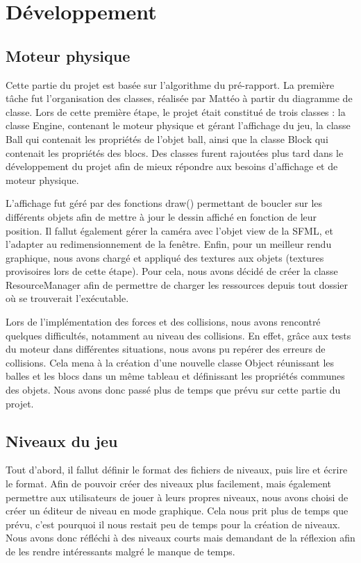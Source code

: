 \chapter{Développement}

\section{Moteur physique}

Cette partie du projet est basée sur l'algorithme du pré-rapport.
La première tâche fut l'organisation des classes, réalisée par Mattéo
à partir du diagramme de classe. Lors de cette première étape, le projet
était constitué de trois classes : la classe Engine, contenant le moteur
physique et gérant l'affichage du jeu, la classe Ball qui contenait les
propriétés de l'objet ball, ainsi que la classe Block qui contenait les
propriétés des blocs. Des classes furent rajoutées plus tard dans le
développement du projet afin de mieux répondre aux besoins d'affichage
et de moteur physique.

L'affichage fut géré par des fonctions draw() permettant de boucler
sur les différents objets afin de mettre à jour le dessin affiché en
fonction de leur position. Il fallut également gérer la caméra avec
l'objet view de la SFML, et l'adapter au redimensionnement de la
fenêtre. Enfin, pour un meilleur rendu graphique, nous avons chargé
et appliqué des textures aux objets (textures provisoires lors de
cette étape). Pour cela, nous avons décidé de créer la classe
ResourceManager afin de permettre de charger les ressources depuis
tout dossier où se trouverait l'exécutable.

Lors de l'implémentation des forces et des collisions, nous avons
rencontré quelques difficultés, notamment au niveau des collisions.
En effet, grâce aux tests du moteur dans différentes situations,
nous avons pu repérer des erreurs de collisions. Cela mena à la
création d'une nouvelle classe Object réunissant les balles et les
blocs dans un même tableau et définissant les propriétés communes
des objets. Nous avons donc passé plus de temps que prévu sur cette
partie du projet.

\section{Niveaux du jeu}

Tout d'abord, il fallut définir le format des fichiers de niveaux,
puis lire et écrire le format. Afin de pouvoir créer des niveaux
plus facilement, mais également permettre aux utilisateurs de jouer
à leurs propres niveaux, nous avons choisi de créer un éditeur de
niveau en mode graphique. Cela nous prit plus de temps que prévu,
c'est pourquoi il nous restait peu de temps pour la création de
niveaux. Nous avons donc réfléchi à des niveaux courts mais
demandant de la réflexion afin de les rendre intéressants
malgré le manque de temps.

